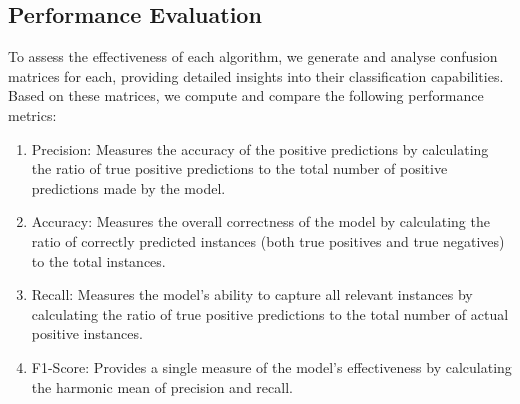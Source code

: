 \documentclass[12pt,a4paper]{report}
\begin{document}
\begin{spacing}{1.5}
\section*{Performance Evaluation}
To assess the effectiveness of each algorithm, we generate and analyse confusion matrices for each, providing detailed insights into their classification capabilities. Based on these matrices, we compute and compare the following performance metrics:
\begin{enumerate}
\item Precision: Measures the accuracy of the positive predictions by calculating the ratio of true positive predictions to the total number of positive predictions made by the model.
\item Accuracy: Measures the overall correctness of the model by calculating the ratio of correctly predicted instances (both true positives and true negatives) to the total instances.
\item Recall: Measures the model’s ability to capture all relevant instances by calculating the ratio of true positive predictions to the total number of actual positive instances.
\item F1-Score: Provides a single measure of the model’s effectiveness by calculating the harmonic mean of precision and recall.
\end{enumerate}
\end{spacing}
\end{document}
